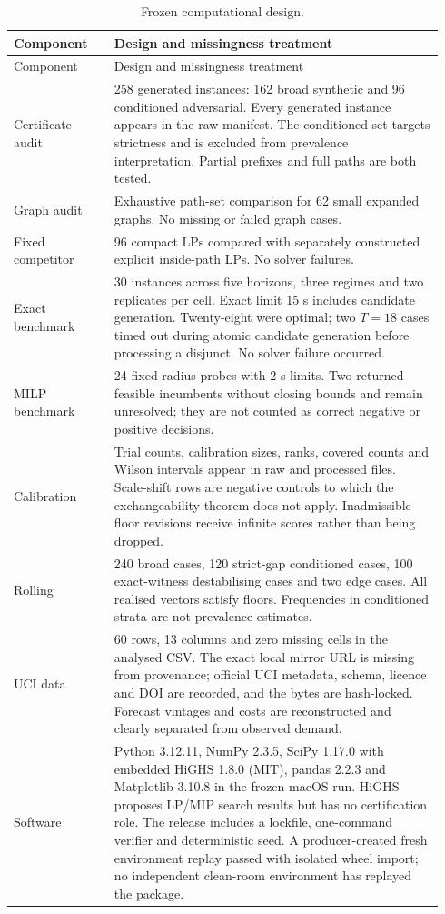 \documentclass[11pt]{article}
\theoremstyle{definition}
\begin{document}
\begin{longtable}{@{}p{0.22\linewidth}p{0.72\linewidth}@{}}
\caption{Frozen computational design.}\label{tab:design}\\
\toprule
Component & Design and missingness treatment \\
\midrule
\endfirsthead
\toprule
Component & Design and missingness treatment \\
\midrule
\endhead
Certificate audit & 258 generated instances: 162 broad synthetic and 96 conditioned adversarial. Every generated instance appears in the raw manifest. The conditioned set targets strictness and is excluded from prevalence interpretation. Partial prefixes and full paths are both tested. \\
Graph audit & Exhaustive path-set comparison for 62 small expanded graphs. No missing or failed graph cases. \\
Fixed competitor & 96 compact LPs compared with separately constructed explicit inside-path LPs. No solver failures. \\
Exact benchmark & 30 instances across five horizons, three regimes and two replicates per cell. Exact limit 15 s includes candidate generation. Twenty-eight were optimal; two $T=18$ cases timed out during atomic candidate generation before processing a disjunct. No solver failure occurred. \\
MILP benchmark & 24 fixed-radius probes with 2 s limits. Two returned feasible incumbents without closing bounds and remain unresolved; they are not counted as correct negative or positive decisions. \\
Calibration & Trial counts, calibration sizes, ranks, covered counts and Wilson intervals appear in raw and processed files. Scale-shift rows are negative controls to which the exchangeability theorem does not apply. Inadmissible floor revisions receive infinite scores rather than being dropped. \\
Rolling & 240 broad cases, 120 strict-gap conditioned cases, 100 exact-witness destabilising cases and two edge cases. All realised vectors satisfy floors. Frequencies in conditioned strata are not prevalence estimates. \\
UCI data & 60 rows, 13 columns and zero missing cells in the analysed CSV. The exact local mirror URL is missing from provenance; official UCI metadata, schema, licence and DOI are recorded, and the bytes are hash-locked. Forecast vintages and costs are reconstructed and clearly separated from observed demand. \\
Software & Python 3.12.11, NumPy 2.3.5, SciPy 1.17.0 with embedded HiGHS 1.8.0 (MIT), pandas 2.2.3 and Matplotlib 3.10.8 in the frozen macOS run. HiGHS proposes LP/MIP search results but has no certification role. The release includes a lockfile, one-command verifier and deterministic seed. A producer-created fresh environment replay passed with isolated wheel import; no independent clean-room environment has replayed the package. \\
\bottomrule
\end{longtable}
\end{document}
